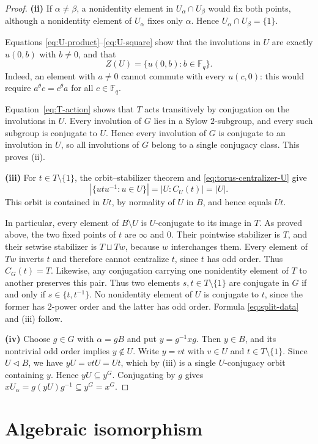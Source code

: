 \documentclass[11pt]{amsart}
\numberwithin{equation}{section}
\theoremstyle{definition}
\theoremstyle{remark}
\newcommand{\F}{\mathbb F}
\begin{document}
\begin{proof}
\textbf{(ii)} If $\alpha\ne\beta$, a nonidentity element in
$U_\alpha\cap U_\beta$ would fix both points, although a
nonidentity element of $U_\alpha$ fixes only $\alpha$. Hence
$U_\alpha\cap U_\beta=\{1\}$.

Equations \eqref{eq:U-product}--\eqref{eq:U-square} show that the
involutions in $U$ are exactly $u(0,b)$ with $b\ne0$, and that
\[
 Z(U)=\{u(0,b):b\in\F_q\}.
\]
Indeed, an element with $a\ne0$ cannot commute with every $u(c,0)$:
this would require $a^\theta c=c^\theta a$ for all $c\in\F_q$. 

Equation~\eqref{eq:T-action} shows that $T$ acts transitively
by conjugation on the involutions in $U$. Every involution
of $G$ lies in a Sylow $2$-subgroup, and every such subgroup
is conjugate to $U$. Hence every involution of $G$ is
conjugate to an involution in $U$, so all involutions of $G$
belong to a single conjugacy class. This proves (ii).

\textbf{(iii)} For $t\in T\setminus\{1\}$, the orbit--stabilizer theorem
and \eqref{eq:torus-centralizer-U} give
\[
 |\{utu^{-1}:u\in U\}|=|U:C_U(t)|=|U|.
\] 
This orbit is contained in $Ut$, by normality of $U$ in $B$, and hence equals $Ut$. 

In particular, every element of $B\setminus U$ is
$U$-conjugate to its image in $T$.
As proved above, the two fixed points of $t$ are $\infty$ and $0$.
Their pointwise stabilizer is $T$, and their setwise stabilizer
is $T\sqcup Tw$, because $w$ interchanges them. 
Every element of \(Tw\) inverts \(t\) and therefore cannot centralize \(t\), since \(t\) has odd order.
Thus $C_G(t)=T$.
Likewise, any conjugation carrying one nonidentity element of $T$ to another preserves this pair. Thus two elements \(s,t\in T\setminus\{1\}\) are conjugate in \(G\) if and only if \(s\in\{t,t^{-1}\}\).
No nonidentity element of $U$ is conjugate to $t$, since the former
has $2$-power order and the latter has odd order. Formula
\eqref{eq:split-data} and (iii) follow.

\textbf{(iv)} Choose $g\in G$ with $\alpha=gB$ and put
$y=g^{-1}xg$. Then $y\in B$, and its nontrivial odd order implies
$y\notin U$. Write $y=vt$ with $v\in U$ and
$t\in T\setminus\{1\}$. Since $U\lhd B$, we have
$yU=vtU=Ut$, which by (iii) is a single $U$-conjugacy orbit
containing $y$. Hence $yU\subseteq y^G$. Conjugating by $g$ gives
$xU_\alpha = g(yU) g^{-1}\subseteq y^G=x^G$.
\end{proof}

\section{Algebraic isomorphism}
\end{document}
